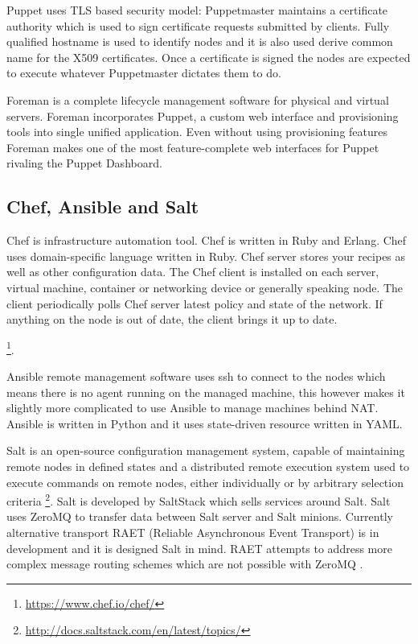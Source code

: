 \documentclass[a4paper,11pt]{kth-mag}
\begin{document}
Puppet uses TLS based security model:
Puppetmaster maintains a certificate authority which is used
to sign certificate requests submitted by clients.
Fully qualified hostname is used to identify nodes and
it is also used derive common name for the X509 certificates.
Once a certificate is signed the nodes are expected to
execute whatever Puppetmaster dictates them to do.

Foreman is a complete lifecycle management software for physical and virtual
servers. Foreman incorporates Puppet, a custom web interface and provisioning
tools into single unified application. Even without using provisioning features
Foreman makes one of the most feature-complete web interfaces for Puppet
rivaling the Puppet Dashboard.

\subsection{Chef, Ansible and Salt}

Chef is infrastructure automation tool. Chef is written in Ruby and Erlang.
Chef uses domain-specific language written in Ruby.
Chef server stores your recipes as well as other configuration data.
The Chef client is installed on each server, virtual machine, container
or networking device or generally speaking node.
The client periodically polls Chef server latest policy and
state of the network. If anything on the node is out of date,
the client brings it up to date.

\cite{linuxmag-7841}


\footnote{\url{https://www.chef.io/chef/}}.

Ansible remote management software uses \acrfull{ssh} to connect to the nodes which
means there is no agent running on the managed machine, this however makes
it slightly more complicated to use Ansible to manage machines behind NAT.
Ansible is written in Python and it uses state-driven resource
written in YAML.

Salt is an open-source configuration management system,
capable of maintaining remote nodes in defined states and
a distributed remote execution system used to execute commands
on remote nodes, either individually or by arbitrary selection criteria
\footnote{\url{http://docs.saltstack.com/en/latest/topics/}}.
Salt is developed by SaltStack which sells services around Salt.
Salt uses ZeroMQ to transfer data between Salt server and
Salt minions.
Currently alternative transport
RAET (Reliable Asynchronous Event Transport)
is in development and it is designed Salt in mind.
RAET attempts to address more complex message routing
schemes which are not possible with ZeroMQ \cite{raet}.
\end{document}
